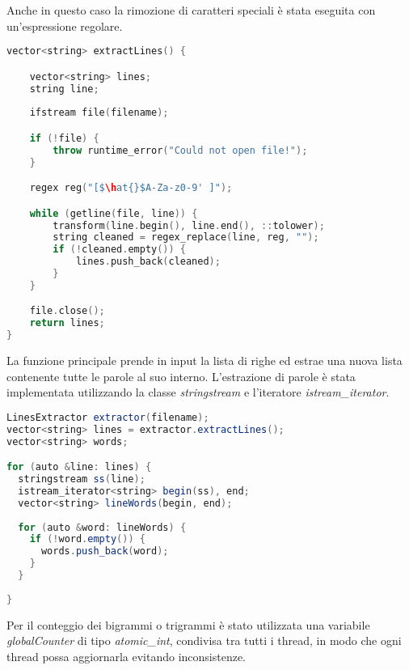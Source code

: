 \documentclass[10pt,twocolumn,letterpaper]{article}
\begin{document}
Anche in questo caso la rimozione di caratteri speciali è stata eseguita con un’espressione regolare.\newline

\begin{lstlisting}[basicstyle=\scriptsize, language=C++, frame=single, caption={Esempio di estrazione di righe da un file in C++},captionpos=b,showstringspaces=false, mathescape=true]
vector<string> extractLines() {

    vector<string> lines;
    string line;
    
    ifstream file(filename);

    if (!file) {
        throw runtime_error("Could not open file!");
    }

    regex reg("[$\hat{}$A-Za-z0-9' ]");

    while (getline(file, line)) {
        transform(line.begin(), line.end(), ::tolower);
        string cleaned = regex_replace(line, reg, "");
        if (!cleaned.empty()) {
            lines.push_back(cleaned);
        }
    }

    file.close();
    return lines;
}
\end{lstlisting}

La funzione principale prende in input la lista di righe ed estrae una nuova lista contenente tutte le parole al suo interno. L'estrazione di parole è stata implementata utilizzando la classe \textit{stringstream} e l'iteratore \textit{istream\_iterator}.\newline

\begin{lstlisting}[basicstyle=\scriptsize, language=Java, frame=single, caption={Esempio di estrazione di parole in C++},captionpos=b, showstringspaces=false]
LinesExtractor extractor(filename);
vector<string> lines = extractor.extractLines();
vector<string> words;

for (auto &line: lines) {
  stringstream ss(line);
  istream_iterator<string> begin(ss), end;
  vector<string> lineWords(begin, end);
  
  for (auto &word: lineWords) {
    if (!word.empty()) { 
      words.push_back(word);
    }
  }
  
}
\end{lstlisting}

Per il conteggio dei bigrammi o trigrammi è stato utilizzata una variabile \textit{globalCounter} di tipo \textit{atomic\_int}, condivisa tra tutti i thread, in modo che ogni thread possa aggiornarla evitando inconsistenze.
\end{document}
